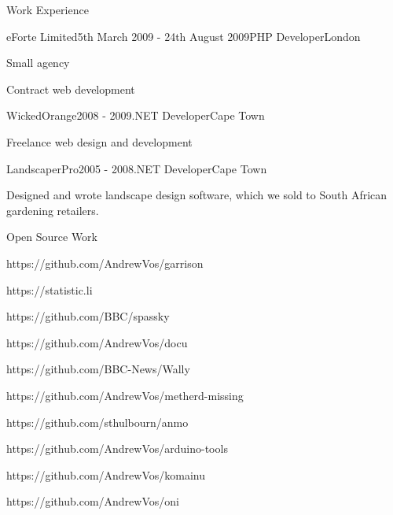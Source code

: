 \documentclass{resume}
\begin{document}
\begin{rSection}{Work Experience}
    \begin{rSubsection}{eForte Limited}{5th March 2009 - 24th August 2009}{PHP Developer}{London}
      \item Small agency
      \item Contract web development
    \end{rSubsection}

    \begin{rSubsection}{WickedOrange}{2008 - 2009}{.NET Developer}{Cape Town}
      \item Freelance web design and development
    \end{rSubsection}

    \begin{rSubsection}{LandscaperPro}{2005 - 2008}{.NET Developer}{Cape Town}
      \item Designed and wrote landscape design software, which we sold to South African gardening retailers.
    \end{rSubsection}
  \end{rSection}

  \begin{rSection}{Open Source Work}
    \item https://github.com/AndrewVos/garrison
    \item https://statistic.li
    \item https://github.com/BBC/spassky
    \item https://github.com/AndrewVos/docu
    \item https://github.com/BBC-News/Wally
    \item https://github.com/AndrewVos/metherd-missing
    \item https://github.com/sthulbourn/anmo
    \item https://github.com/AndrewVos/arduino-tools
    \item https://github.com/AndrewVos/komainu
    \item https://github.com/AndrewVos/oni
  \end{rSection}
\end{document}
